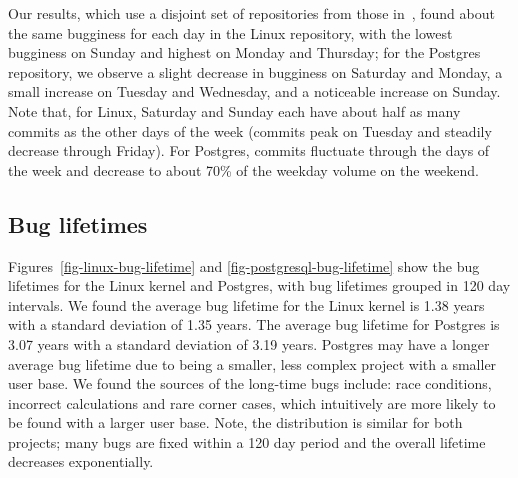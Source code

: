 Our results, which use a disjoint set of repositories from those
in~\cite{sliwerski-msr-2005}, found about the same bugginess for each
day in the Linux repository, with the lowest bugginess on Sunday and
highest on Monday and Thursday; for the Postgres repository, we
observe a slight decrease in bugginess on Saturday and Monday, a small
increase on Tuesday and Wednesday, and a noticeable increase on
Sunday.  Note that, for Linux, Saturday and Sunday each have about
half as many commits as the other days of the week (commits peak on
Tuesday and steadily decrease through Friday). For Postgres, commits
fluctuate through the days of the week and decrease to about 70\% of
the weekday volume on the weekend.



\subsection{Bug lifetimes}
Figures~\ref{fig-linux-bug-lifetime} and
\ref{fig-postgresql-bug-lifetime} show the bug lifetimes for the Linux
kernel and Postgres, with bug lifetimes grouped in 120 day
intervals. We found the average bug lifetime for the Linux kernel is
1.38 years with a standard deviation of 1.35 years. The average bug
lifetime for Postgres is 3.07 years with a standard deviation of 3.19
years. Postgres may have a longer average bug lifetime due to being a
smaller, less complex project with a smaller user base. We found the
sources of the long-time bugs include: race conditions, incorrect
calculations and rare corner cases, which intuitively are more likely
to be found with a larger user base.  Note, the distribution is
similar for both projects; many bugs are fixed within a 120 day period
and the overall lifetime decreases exponentially.

